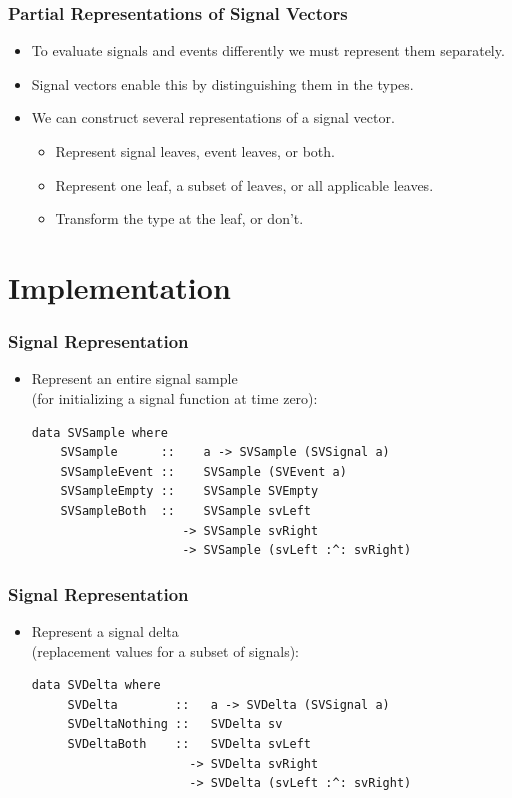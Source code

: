 \documentclass{beamer}
\begin{document}
\begin{frame}
\frametitle{Partial Representations of Signal Vectors}
    \begin{itemize}
        \item To evaluate signals and events differently we must represent them separately.
        \item Signal vectors enable this by distinguishing them in the types.
        \item We can construct several representations of a signal vector.
        \begin{itemize}
          \item Represent signal leaves, event leaves, or both.
          \item Represent one leaf, a subset of leaves, or all applicable leaves.
          \item Transform the type at the leaf, or don't.
        \end{itemize}
    \end{itemize}
\end{frame}

\section{Implementation}

\begin{frame}[fragile]
\frametitle{Signal Representation}
    \begin{itemize} 
        \item Represent an entire signal sample\\ (for initializing a signal function at time zero):
\begin{Verbatim}
data SVSample where
    SVSample      ::    a -> SVSample (SVSignal a)
    SVSampleEvent ::    SVSample (SVEvent a)
    SVSampleEmpty ::    SVSample SVEmpty
    SVSampleBoth  ::    SVSample svLeft 
                     -> SVSample svRight
                     -> SVSample (svLeft :^: svRight) 
\end{Verbatim}
    \end{itemize}
\end{frame}

\begin{frame}[fragile]
\frametitle{Signal Representation}
    \begin{itemize} 
        \item Represent a signal delta\\ (replacement values for a subset of signals):
\begin{Verbatim}
data SVDelta where
     SVDelta        ::   a -> SVDelta (SVSignal a)
     SVDeltaNothing ::   SVDelta sv
     SVDeltaBoth    ::   SVDelta svLeft 
                      -> SVDelta svRight
                      -> SVDelta (svLeft :^: svRight) 
\end{Verbatim}
    \end{itemize}
\end{frame}
\end{document}
